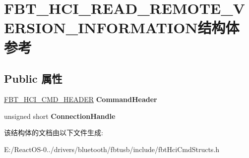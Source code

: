 \hypertarget{struct_f_b_t___h_c_i___r_e_a_d___r_e_m_o_t_e___v_e_r_s_i_o_n___i_n_f_o_r_m_a_t_i_o_n}{}\section{F\+B\+T\+\_\+\+H\+C\+I\+\_\+\+R\+E\+A\+D\+\_\+\+R\+E\+M\+O\+T\+E\+\_\+\+V\+E\+R\+S\+I\+O\+N\+\_\+\+I\+N\+F\+O\+R\+M\+A\+T\+I\+O\+N结构体 参考}
\label{struct_f_b_t___h_c_i___r_e_a_d___r_e_m_o_t_e___v_e_r_s_i_o_n___i_n_f_o_r_m_a_t_i_o_n}
\subsection*{Public 属性}
\begin{DoxyCompactItemize}
\item 
\mbox{\label{struct_f_b_t___h_c_i___r_e_a_d___r_e_m_o_t_e___v_e_r_s_i_o_n___i_n_f_o_r_m_a_t_i_o_n_a5756e3971904f035916cd1319d332ec8}} 
\hyperlink{struct_f_b_t___h_c_i___c_m_d___h_e_a_d_e_r}{F\+B\+T\+\_\+\+H\+C\+I\+\_\+\+C\+M\+D\+\_\+\+H\+E\+A\+D\+ER} {\bfseries Command\+Header}
\item 
\mbox{\label{struct_f_b_t___h_c_i___r_e_a_d___r_e_m_o_t_e___v_e_r_s_i_o_n___i_n_f_o_r_m_a_t_i_o_n_a6613ea4a5ddd3ded1b064a39b4ec5036}} 
unsigned short {\bfseries Connection\+Handle}
\end{DoxyCompactItemize}


该结构体的文档由以下文件生成\+:\begin{DoxyCompactItemize}
\item 
E\+:/\+React\+O\+S-\/0../drivers/bluetooth/fbtusb/include/fbt\+Hci\+Cmd\+Structs.\+h\end{DoxyCompactItemize}
